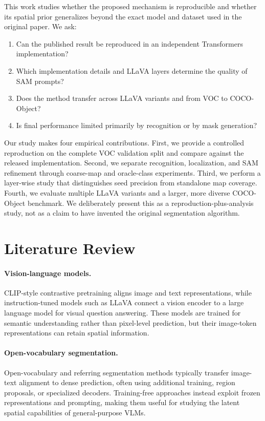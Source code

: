 \documentclass{article}
\begin{document}
This work studies whether the proposed mechanism is reproducible and whether its spatial prior
generalizes beyond the exact model and dataset used in the original paper. We ask:
\begin{enumerate}
    \item Can the published result be reproduced in an independent Transformers implementation?
    \item Which implementation details and LLaVA layers determine the quality of SAM prompts?
    \item Does the method transfer across LLaVA variants and from VOC to COCO-Object?
    \item Is final performance limited primarily by recognition or by mask generation?
\end{enumerate}

Our study makes four empirical contributions. First, we provide a controlled reproduction on the
complete VOC validation split and compare against the released implementation. Second, we separate
recognition, localization, and SAM refinement through coarse-map and oracle-class experiments.
Third, we perform a layer-wise study that distinguishes seed precision from standalone map
coverage. Fourth, we evaluate multiple LLaVA variants and a larger, more diverse COCO-Object
benchmark. We deliberately present this as a reproduction-plus-analysis study, not as a claim to
have invented the original segmentation algorithm.

\section{Literature Review}
\label{sec:literature}
\paragraph{Vision-language models.}
CLIP-style contrastive pretraining aligns image and text representations, while instruction-tuned
models such as LLaVA connect a vision encoder to a large language model for visual question
answering. These models are trained for semantic understanding rather than pixel-level prediction,
but their image-token representations can retain spatial information.

\paragraph{Open-vocabulary segmentation.}
Open-vocabulary and referring segmentation methods typically transfer image-text alignment to
dense prediction, often using additional training, region proposals, or specialized decoders.
Training-free approaches instead exploit frozen representations and prompting, making them useful
for studying the latent spatial capabilities of general-purpose VLMs.
\end{document}

